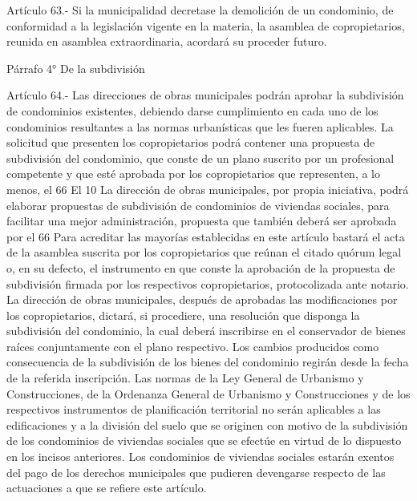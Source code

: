     Artículo 63.- Si la municipalidad decretase la demolición de un condominio, de conformidad a la legislación vigente en la materia, la asamblea de copropietarios, reunida en asamblea extraordinaria, acordará su proceder futuro.
     
    Párrafo 4°
    De la subdivisión
   
    Artículo 64.- Las direcciones de obras municipales podrán aprobar la subdivisión de condominios existentes, debiendo darse cumplimiento en cada uno de los condominios resultantes a las normas urbanísticas que les fueren aplicables.
    La solicitud que presenten los copropietarios podrá contener una propuesta de subdivisión del condominio, que conste de un plano suscrito por un profesional competente y que esté aprobada por los copropietarios que representen, a lo menos, el 66%
    El 10%
    La dirección de obras municipales, por propia iniciativa, podrá elaborar propuestas de subdivisión de condominios de viviendas sociales, para facilitar una mejor administración, propuesta que también deberá ser aprobada por el 66%
    Para acreditar las mayorías establecidas en este artículo bastará el acta de la asamblea suscrita por los copropietarios que reúnan el citado quórum legal o, en su defecto, el instrumento en que conste la aprobación de la propuesta de subdivisión firmada por los respectivos copropietarios, protocolizada ante notario.
    La dirección de obras municipales, después de aprobadas las modificaciones por los copropietarios, dictará, si procediere, una resolución que disponga la subdivisión del condominio, la cual deberá inscribirse en el conservador de bienes raíces conjuntamente con el plano respectivo. Los cambios producidos como consecuencia de la subdivisión de los bienes del condominio regirán desde la fecha de la referida inscripción.
    Las normas de la Ley General de Urbanismo y Construcciones, de la Ordenanza General de Urbanismo y Construcciones y de los respectivos instrumentos de planificación territorial no serán aplicables a las edificaciones y a la división del suelo que se originen con motivo de la subdivisión de los condominios de viviendas sociales que se efectúe en virtud de lo dispuesto en los incisos anteriores.
    Los condominios de viviendas sociales estarán exentos del pago de los derechos municipales que pudieren devengarse respecto de las actuaciones a que se refiere este artículo.

